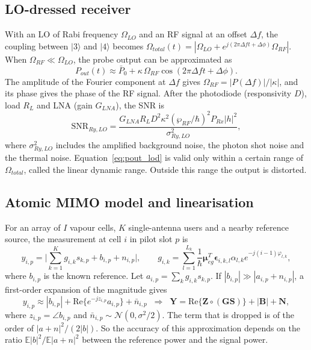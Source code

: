 \documentclass[11pt,a4paper]{article}
\begin{document}
\subsection{LO-dressed receiver}

With an LO of Rabi frequency $\Omega_{LO}$ and an RF signal at an offset $\Delta f$, the
coupling between $|3\rangle$ and $|4\rangle$ becomes
$\Omega_{total}(t)=|\Omega_{LO}+e^{j(2\pi\Delta f t+\Delta\phi)}\Omega_{RF}|$. When
$\Omega_{RF}\ll\Omega_{LO}$, the probe output can be approximated as
\begin{equation}
P_{out}(t)\approx\bar P_0+\kappa\,\Omega_{RF}\cos(2\pi\Delta f t+\Delta\phi).
\label{eq:pout_lod}
\end{equation}
The amplitude of the Fourier component at $\Delta f$ gives $\Omega_{RF}=|P(\Delta f)|/|\kappa|$,
and its phase gives the phase of the RF signal. After the photodiode (responsivity $D$), load
$R_L$ and LNA (gain $G_{LNA}$), the SNR is
\begin{equation}
\mathrm{SNR}_{Ry,LO}=\frac{G_{LNA}R_LD^2\kappa^2(\wp_{RF}/\hbar)^2P_{Rx}|h|^2}{\sigma^2_{Ry,LO}},
\label{eq:snr_lod}
\end{equation}
where $\sigma^2_{Ry,LO}$ includes the amplified background noise, the photon shot noise and
the thermal noise. Equation~\eqref{eq:pout_lod} is valid only within a certain range of
$\Omega_{total}$, called the linear dynamic range. Outside this range the output is distorted.

\subsection{Atomic MIMO model and linearisation}

For an array of $I$ vapour cells, $K$ single-antenna users and a nearby reference source, the
measurement at cell $i$ in pilot slot $p$ is~\cite{cui2025towards,xu2025channel}
\begin{equation}
y_{i,p}=\Big|\sum_{k=1}^K g_{i,k}s_{k,p}+b_{i,p}+n_{i,p}\Big|,\qquad
g_{i,k}=\sum_{l=1}^{L_k}\frac{1}{\hbar}\boldsymbol\mu_{eg}^T\boldsymbol\epsilon_{i,k,l}\alpha_{l,k}e^{-j(i-1)\varphi_{l,k}},
\label{eq:mimo}
\end{equation}
where $b_{i,p}$ is the known reference. Let $a_{i,p}=\sum_kg_{i,k}s_{k,p}$. If
$|b_{i,p}|\gg|a_{i,p}+n_{i,p}|$, a first-order expansion of the magnitude gives
\begin{equation}
y_{i,p}\approx|b_{i,p}|+\mathrm{Re}\{e^{-jz_{i,p}}a_{i,p}\}+\bar n_{i,p}
\;\;\Longrightarrow\;\;
\mathbf Y=\mathrm{Re}\{\mathbf Z\circ(\mathbf G\mathbf S)\}+|\mathbf B|+\mathbf N,
\label{eq:lin}
\end{equation}
where $z_{i,p}=\angle b_{i,p}$ and $\bar n_{i,p}\sim\mathcal N(0,\sigma^2/2)$. The term that is
dropped is of the order of $|a+n|^2/(2|b|)$. So the accuracy of this approximation depends on
the ratio $\mathbb E|b|^2/\mathbb E|a+n|^2$ between the reference power and the signal power.
\end{document}
